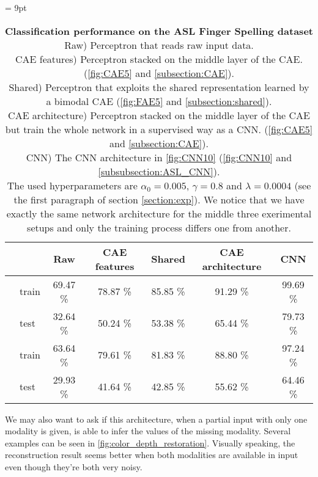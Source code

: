 \begin{table}[H]
  \tabcolsep = 9pt
  \caption{\textbf{Classification performance on the ASL Finger Spelling
    dataset}\\[0.1em]
    Raw) Perceptron that reads raw input data.\\[0.1em]
    CAE features) Perceptron stacked on the middle layer of the CAE.
      (\autoref{fig:CAE5} and \ref{subsection:CAE}).\\[0.1em]
    Shared) Perceptron that exploits the shared representation learned
      by a bimodal CAE (\autoref{fig:FAE5} and
      \ref{subsection:shared}).\\[0.1em]
    CAE architecture) Perceptron stacked on the middle layer of the CAE
      but train the whole network in a supervised way as a CNN.
      (\autoref{fig:CAE5} and \ref{subsection:CAE}).\\[0.1em]
    CNN) The CNN architecture in \autoref{fig:CNN10}
      (\autoref{fig:CNN10} and \ref{subsubsection:ASL_CNN}). \\[0.1em]
    The used hyperparameters are $\alpha_0=0.005$, $\gamma=0.8$ and
    $\lambda=0.0004$ (see the first paragraph of section \ref{section:exp}).
    We notice that we have exactly the same network
    architecture for the middle three exerimental setups and only the
    training process differs one from another.
    }
  \label{tab:ASL_classif}
  \begin{tabular*}{\linewidth}{>{\bf}llccccc}
    \toprule
    && Raw & CAE features & Shared & CAE architecture & CNN\\
    \midrule
    \multirow{2}{*}{Intensity} &
    train & 69.47 \% & 78.87 \% & 85.85 \% & 91.29 \% & 99.69 \% \\
    & test & 32.64 \% & 50.24 \% & 53.38 \% & 65.44 \% & 79.73 \% \\
    \midrule
    \multirow{2}{*}{Depth} &
    train & 63.64 \% & 79.61 \% & 81.83 \% & 88.80 \% & 97.24 \% \\
    & test & 29.93 \% & 41.64 \% & 42.85 \% & 55.62 \% & 64.46 \% \\
    \bottomrule
  \end{tabular*}
\end{table}
\vspace{-10pt}

We may also want to ask if this architecture, when a partial input with
only one modality is given, is able to infer the values of the missing
modality.
Several examples can be seen in \autoref{fig:color_depth_restoration}.
Visually speaking, the reconstruction result seems better when
both modalities are available in input even though they're both very noisy.

